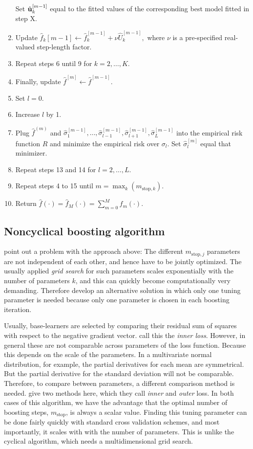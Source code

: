 \begin{algorithm}
\begin{enumerate}
        Set $\hat{\mathbf{u}}^{[m-1]}_k$ equal to the fitted values of the corresponding best model fitted in step X.
    \item Update $\hat{f}_k{[m-1]}\gets\hat{f}_k^{[m-1]}+\nu\hat{U}_k^{[m-1]},$ where $\nu$ is a pre-specified real-valued step-length factor.
    \item Repeat steps 6 until 9 for $k=2,\ldots,K$. 
    \item Finally, update $\hat{f}^{[m]}\gets\hat{f}^{[m-1]}$.
    \item Set $l=0$.
    \item Increase $l$ by 1.
    \item Plug $\hat{f}^{(m)}$ and $\hat{\sigma}_1^{[m-1]},\ldots,\hat{\sigma}_{l-1}^{[m-1]},\hat{\sigma}_{l+1}^{[m-1]},\hat{\sigma}_{L}^{[m-1]}$ into the empirical risk function $R$ and minimize the empirical risk over $\sigma_l$. Set $\hat{\sigma}_l^{[m]}$ equal that minimizer.
    \item Repeat steps 13 and 14 for $l=2,\ldots,L$.
    \item Repeat steps 4 to 15 until $m=\max_k(m_{\text{stop},k})$.
    \item Return $\hat{f}(\cdot)=\hat{f}_M(\cdot)=\sum_{m=0}^Mf_m(\cdot)$.
\end{enumerate}
\end{algorithm}

\subsection{Noncyclical boosting algorithm}
\citet{thomas2018} point out a problem with the approach above: The different $m_{\text{stop},j}$ parameters are not independent of each other, and hence have to be jointly optimized. The usually applied \textit{grid search} for such parameters scales exponentially with the number of parameters $k$, and this can quickly become computationally very demanding. Therefore \citet{thomas2018} develop an alternative solution in which only one tuning parameter is needed because only one parameter is chosen in each boosting iteration.

Usually, base-learners are selected by comparing their residual sum of squares with respect to the negative gradient vector. \citet{thomas2018} call this the \textit{inner loss}. However, in general these are not comparable across parameters of the loss function. Because this depends on the scale of the parameters. In a multivariate normal distribution, for example, the partial derivatives for each mean are symmetrical. But the partial derivative for the standard deviation will not be comparable. Therefore, to compare between parameters, a different comparison method is needed. \citet{thomas2018} give two methods here, which they call \textit{inner} and \textit{outer} loss. In both cases of this algorithm, we have the advantage that the optimal number of boosting steps, $m_{\text{stop}}$, is always a scalar value. Finding this tuning parameter can be done fairly quickly with standard cross validation schemes, and most importantly, it scales with with the number of parameters. This is unlike the cyclical algorithm, which needs a multidimensional grid search.

